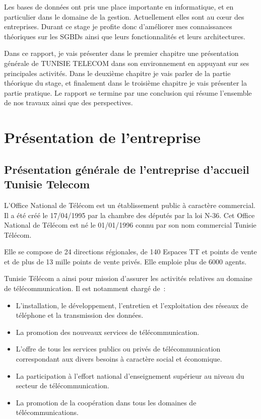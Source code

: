 \documentclass[12pt,a4paper]{report}
\begin{document}
Les bases de données ont pris une place importante en informatique, et en
particulier dans le domaine de la gestion. Actuellement elles sont au c\oe{}ur
des entreprises. Durant ce stage je profite donc d'améliorer mes connaissances
théoriques sur les SGBDs ainsi que leurs fonctionnalités et leurs architectures.

Dans ce rapport, je vais présenter dans le premier chapitre une présentation
générale de TUNISIE TELECOM dans son environnement en appuyant sur ses
principales activités. Dans le deuxième chapitre je vais parler de la partie
théorique du stage, et finalement dans le troisième chapitre je vais présenter
la partie pratique. Le rapport se termine par une conclusion qui résume
l'ensemble de nos travaux ainsi que des perspectives.

\chapter{Présentation de l'entreprise}

\section{Présentation générale de l'entreprise d'accueil Tunisie Telecom}

L'Office National de Télécom est un établissement public à caractère commercial.
Il a été créé le 17/04/1995 par la chambre des députés par la loi N-36.
Cet Office National de Télécom est né le 01/01/1996 connu par son nom commercial
Tunisie Télécom.

Elle se compose de 24 directions régionales, de 140 Espaces TT et points de vente
et de plus de 13 mille points de vente privés. Elle emploie plus de 6000 agents.

Tunisie Télécom a ainsi pour mission d'assurer les activités relatives au domaine
de télécommunication. Il est notamment chargé de~:

\begin{itemize}[leftmargin=*]
  \item L'installation, le développement, l'entretien et l'exploitation des réseaux
        de téléphone et la transmission des données.
  \item La promotion des nouveaux services de télécommunication.
  \item L'offre de tous les services publics ou privés de télécommunication
        correspondant aux divers besoins à caractère social et économique.
  \item La participation à l'effort national d'enseignement supérieur au niveau
        du secteur de télécommunication.
  \item La promotion de la coopération dans tous les domaines de télécommunications.
\end{itemize}
\end{document}
